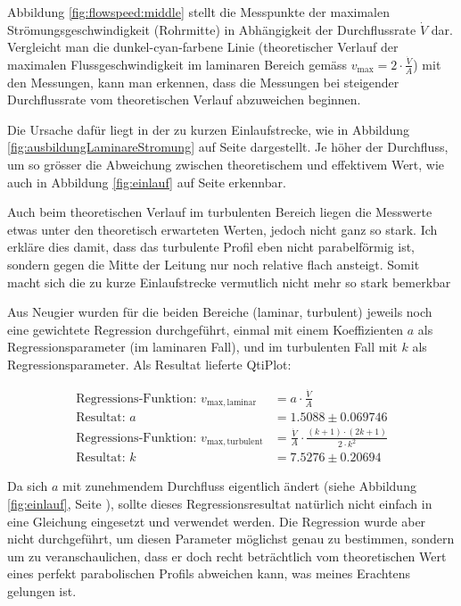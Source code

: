 \begin{samepage}
Abbildung  \ref{fig:flowspeed:middle}  stellt  die  Messpunkte  der  maximalen
Str\"omungsgeschwindigkeit  (Rohrmitte) in  Abh\"angigkeit der  Durchflussrate
$\dot{V}$ dar.   Vergleicht man  die dunkel-cyan-farbene  Linie (theoretischer
Verlauf  der  maximalen  Flussgeschwindigkeit im  laminaren  Bereich  gem\"ass
$v_{\mathrm{max}} =  2 \cdot \frac{\dot{V}}{A}$)  mit den Messungen,  kann man
erkennen, dass  die Messungen bei steigender  Durchflussrate vom theoretischen
Verlauf abzuweichen beginnen.

Die    Ursache   daf\"ur    liegt   in    der   zu    kurzen   Einlaufstrecke,
wie    in    Abbildung    \ref{fig:ausbildungLaminareStromung}    auf    Seite
\pageref{fig:ausbildungLaminareStromung}    dargestellt. Je     h\"oher    der
Durchfluss,  um  so  gr\"osser   die  Abweichung  zwischen  theoretischem  und
effektivem   Wert,  wie   auch  in   Abbildung  \ref{fig:einlauf}   auf  Seite
\pageref{fig:einlauf} erkennbar.

Auch beim  theoretischen Verlauf im  turbulenten Bereich liegen  die Messwerte
etwas unter den theoretisch erwarteten Werten, jedoch nicht ganz so stark. Ich
erkl\"are dies  damit, dass das  turbulente Profil eben  nicht parabelf\"ormig
ist,  sondern   gegen  die   Mitte  der  Leitung   nur  noch   relative  flach
ansteigt. Somit macht sich  die zu kurze Einlaufstrecke  vermutlich nicht mehr
so stark bemerkbar

Aus Neugier wurden f\"ur die beiden Bereiche (laminar, turbulent) jeweils noch
eine gewichtete Regression durchgef\"uhrt,  einmal mit einem Koeffizienten $a$
als Regressionsparameter (im laminaren Fall),  und im turbulenten Fall mit $k$
als Regressionsparameter. Als Resultat lieferte QtiPlot:

\begin{align}
    \label{eq:rohrmitte:regressionresults}
    \text{Regressions-Funktion: } v_{\mathrm{max, laminar}}     &= a \cdot \frac{\dot{V}}{A} \\
    \text{Resultat: }                                                  a &= 1.5088 \pm 0.069746 \\
    \text{Regressions-Funktion: } v_{\mathrm{max, turbulent}} &= \frac{\dot{V}}{A} \cdot \frac{(k + 1) \cdot (2k + 1)}{2 \cdot k^2} \\
    \text{Resultat: }                                                  k &= 7.5276 \pm 0.20694
\end{align}
\end{samepage}

Da sich  $a$ mit zunehmendem  Durchfluss eigentlich \"andert  (siehe Abbildung
\ref{fig:einlauf}, Seite \pageref{fig:einlauf}\footnotemark[4]), sollte dieses
Regressionsresultat nat\"urlich nicht einfach in eine Gleichung eingesetzt und
verwendet werden. Die  Regression wurde  aber nicht durchgef\"uhrt,  um diesen
Parameter  m\"oglichst genau  zu  bestimmen, sondern  um zu  veranschaulichen,
dass  er  doch  recht  betr\"achtlich vom  theoretischen  Wert  eines  perfekt
parabolischen Profils abweichen kann, was meines Erachtens gelungen ist.

